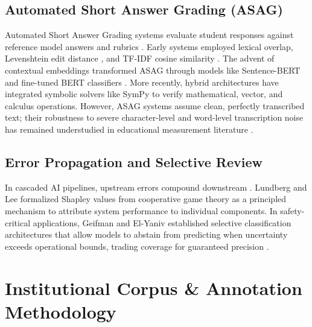 \documentclass[journal]{IEEEtran}
\begin{document}
\subsection{Automated Short Answer Grading (ASAG)}
Automated Short Answer Grading systems evaluate student responses against reference model answers and rubrics \cite{burrows2015asag}. Early systems employed lexical overlap, Levenshtein edit distance \cite{damerau1964distance}, and TF-IDF cosine similarity \cite{mohler2011asag}. The advent of contextual embeddings transformed ASAG through models like Sentence-BERT \cite{reimers2019sbert} and fine-tuned BERT classifiers \cite{devlin2019bert, riordan2017aes}. More recently, hybrid architectures have integrated symbolic solvers like SymPy \cite{sympy2017} to verify mathematical, vector, and calculus operations. However, ASAG systems assume clean, perfectly transcribed text; their robustness to severe character-level and word-level transcription noise has remained understudied in educational measurement literature \cite{heigold2018noise, belinkov2018noise}.

\subsection{Error Propagation and Selective Review}
In cascaded AI pipelines, upstream errors compound downstream \cite{belinkov2018noise}. Lundberg and Lee \cite{lundberg2017shap} formalized Shapley values from cooperative game theory as a principled mechanism to attribute system performance to individual components. In safety-critical applications, Geifman and El-Yaniv \cite{geifman2017selective} established selective classification architectures that allow models to abstain from predicting when uncertainty exceeds operational bounds, trading coverage for guaranteed precision \cite{guo2017calibration}.

\section{Institutional Corpus \& Annotation Methodology}
\end{document}
